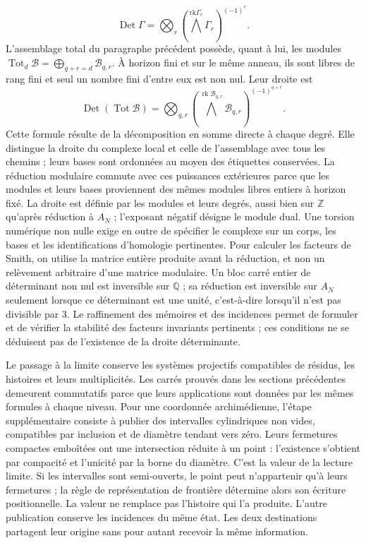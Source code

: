 \[
\operatorname{Det}\Gamma=
\bigotimes_r\left(\bigwedge^{\mathrm{rk}\Gamma_r}\Gamma_r\right)^{(-1)^r}.
\]
L'assemblage total du paragraphe précédent possède, quant à lui, les modules \(\operatorname{Tot}_d\mathcal B=\bigoplus_{q+r=d}\mathcal B_{q,r}\). À horizon fini et sur le même anneau, ils sont libres de rang fini et seul un nombre fini d'entre eux est non nul. Leur droite est
\[
\operatorname{Det}(\operatorname{Tot}\mathcal B)=
\bigotimes_{q,r}
\left(\bigwedge^{\operatorname{rk}\mathcal B_{q,r}}
\mathcal B_{q,r}\right)^{(-1)^{q+r}}.
\]
Cette formule résulte de la décomposition en somme directe à chaque degré. Elle distingue la droite du complexe local et celle de l'assemblage avec tous les chemins ; leurs bases sont ordonnées au moyen des étiquettes conservées. La réduction modulaire commute avec ces puissances extérieures parce que les modules et leurs bases proviennent des mêmes modules libres entiers à horizon fixé.
La droite est définie par les modules et leurs degrés, aussi bien sur \(\mathbb Z\) qu'après réduction à \(A_N\) ; l'exposant négatif désigne le module dual. Une torsion numérique non nulle exige en outre de spécifier le complexe sur un corps, les bases et les identifications d'homologie pertinentes. Pour calculer les facteurs de Smith, on utilise la matrice entière produite avant la réduction, et non un relèvement arbitraire d'une matrice modulaire. Un bloc carré entier de déterminant non nul est inversible sur \(\mathbb Q\) ; sa réduction est inversible sur \(A_N\) seulement lorsque ce déterminant est une unité, c'est-à-dire lorsqu'il n'est pas divisible par \(3\). Le raffinement des mémoires et des incidences permet de formuler et de vérifier la stabilité des facteurs invariants pertinents ; ces conditions ne se déduisent pas de l'existence de la droite déterminante.

Le passage à la limite conserve les systèmes projectifs compatibles de résidus, les histoires et leurs multiplicités. Les carrés prouvés dans les sections précédentes demeurent commutatifs parce que leurs applications sont données par les mêmes formules à chaque niveau. Pour une coordonnée archimédienne, l'étape supplémentaire consiste à publier des intervalles cylindriques non vides, compatibles par inclusion et de diamètre tendant vers zéro. Leurs fermetures compactes emboîtées ont une intersection réduite à un point : l'existence s'obtient par compacité et l'unicité par la borne du diamètre. C'est la valeur de la lecture limite. Si les intervalles sont semi-ouverts, le point peut n'appartenir qu'à leurs fermetures ; la règle de représentation de frontière détermine alors son écriture positionnelle. La valeur ne remplace pas l'histoire qui l'a produite. L'autre publication conserve les incidences du même état. Les deux destinations partagent leur origine sans pour autant recevoir la même information.

